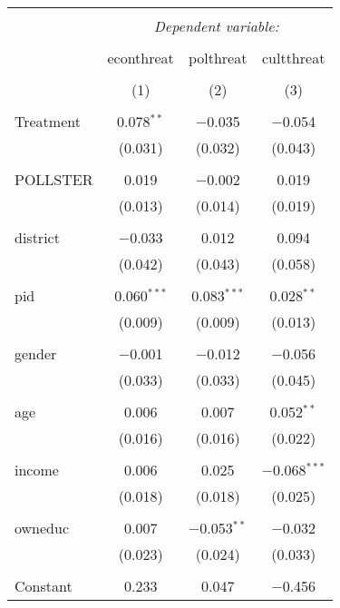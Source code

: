 
\begin{table}[!htbp] \centering 
  \caption{} 
  \label{} 
\begin{tabular}{@{\extracolsep{5pt}}lccc} 
\\[-1.8ex]\hline 
\hline \\[-1.8ex] 
 & \multicolumn{3}{c}{\textit{Dependent variable:}} \\ 
\cline{2-4} 
\\[-1.8ex] & econthreat & polthreat & cultthreat \\ 
\\[-1.8ex] & (1) & (2) & (3)\\ 
\hline \\[-1.8ex] 
 Treatment & 0.078$^{**}$ & $-$0.035 & $-$0.054 \\ 
  & (0.031) & (0.032) & (0.043) \\ 
  & & & \\ 
 POLLSTER & 0.019 & $-$0.002 & 0.019 \\ 
  & (0.013) & (0.014) & (0.019) \\ 
  & & & \\ 
 district & $-$0.033 & 0.012 & 0.094 \\ 
  & (0.042) & (0.043) & (0.058) \\ 
  & & & \\ 
 pid & 0.060$^{***}$ & 0.083$^{***}$ & 0.028$^{**}$ \\ 
  & (0.009) & (0.009) & (0.013) \\ 
  & & & \\ 
 gender & $-$0.001 & $-$0.012 & $-$0.056 \\ 
  & (0.033) & (0.033) & (0.045) \\ 
  & & & \\ 
 age & 0.006 & 0.007 & 0.052$^{**}$ \\ 
  & (0.016) & (0.016) & (0.022) \\ 
  & & & \\ 
 income & 0.006 & 0.025 & $-$0.068$^{***}$ \\ 
  & (0.018) & (0.018) & (0.025) \\ 
  & & & \\ 
 owneduc & 0.007 & $-$0.053$^{**}$ & $-$0.032 \\ 
  & (0.023) & (0.024) & (0.033) \\ 
  & & & \\ 
 Constant & 0.233 & 0.047 & $-$0.456 \\ 

\end{tabular}
\end{table}

